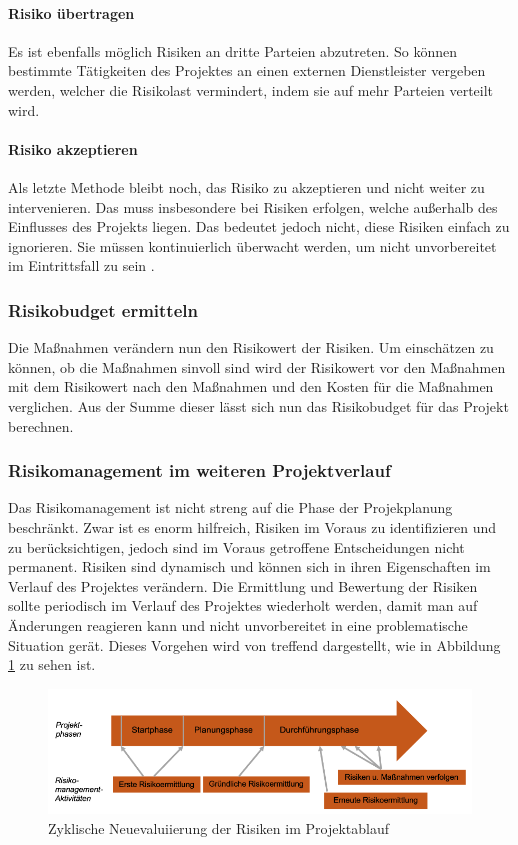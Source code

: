\documentclass[ThesisDJ.tex]{subfiles}
\begin{document}
\paragraph{Risiko übertragen}
Es ist ebenfalls möglich Risiken an dritte Parteien abzutreten. So können bestimmte Tätigkeiten des Projektes an einen externen Dienstleister vergeben werden, welcher die Risikolast vermindert, indem sie auf mehr Parteien verteilt wird. 

\paragraph{Risiko akzeptieren}
Als letzte Methode bleibt noch, das Risiko zu akzeptieren und nicht weiter zu intervenieren. Das muss insbesondere bei Risiken erfolgen, welche außerhalb des Einflusses des Projekts liegen. Das bedeutet jedoch nicht, diese Risiken einfach zu ignorieren. Sie müssen kontinuierlich überwacht werden, um nicht unvorbereitet im Eintrittsfall zu sein \cite{cicek2022risikomanagement}.

\subsubsection{Risikobudget ermitteln}
Die Maßnahmen verändern nun den Risikowert der Risiken. Um einschätzen zu können, ob die Maßnahmen sinvoll sind wird der Risikowert vor den Maßnahmen mit dem Risikowert nach den Maßnahmen und den Kosten für die Maßnahmen verglichen. Aus der Summe dieser lässt sich nun das Risikobudget für das Projekt berechnen.

\subsubsection{Risikomanagement im weiteren Projektverlauf}
Das Risikomanagement ist nicht streng auf die Phase der Projekplanung beschränkt. Zwar ist es enorm hilfreich, Risiken im Voraus zu identifizieren und zu berücksichtigen, jedoch sind im Voraus getroffene Entscheidungen nicht permanent. Risiken sind dynamisch und können sich in ihren Eigenschaften im Verlauf des Projektes verändern. Die Ermittlung und Bewertung der Risiken sollte periodisch im Verlauf des Projektes wiederholt werden, damit man auf Änderungen reagieren kann und nicht unvorbereitet in eine problematische Situation gerät. Dieses Vorgehen wird von \cite[S.~27]{cicek2022risikomanagement} treffend dargestellt, wie in Abbildung \ref{fig:riskcycle} zu sehen ist.

\begin{figure}
    \centering
    \includegraphics[width=\linewidth]{riskcycle.png}
    \caption{Zyklische Neuevaluiierung der Risiken im Projektablauf}
    \label{fig:riskcycle}
\end{figure}
\end{document}
